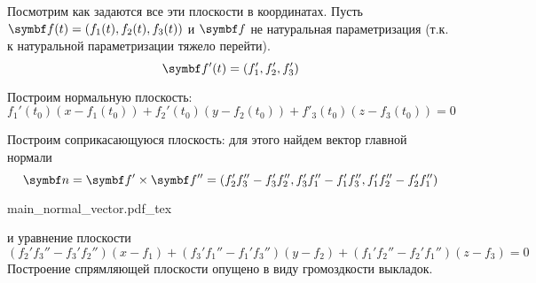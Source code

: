 \documentclass[main]{subfiles}
\begin{document}
Посмотрим как задаются все эти плоскости в координатах.
Пусть
$\vf(t) = (f_1(t), f_2(t), f_3(t))$
и $\vf$ не натуральная параметризация (т.к. к натуральной параметризации тяжело перейти).
\[\vf'(t) = (f_1',f_2',f_3')\]

Построим нормальную плоскость:
\[f_1'(t_0)(x - f_1(t_0)) + f_2'(t_0)(y - f_2(t_0)) + f'_3(t_0)(z - f_3(t_0)) = 0\]

Построим соприкасающуюся плоскость:
для этого найдем вектор главной нормали
\[\vn = \vf' \times \vf'' = (f_2'f_3'' - f_3'f_2'',f_3'f_1'' - f_1'f_3'', f_1'f_2'' - f_2'f_1'')\]
\begin{center}
    {main_normal_vector.pdf_tex}
\end{center}
и уравнение плоскости
\[(f_2'f_3'' - f_3'f_2'')(x - f_1) + (f_3'f_1'' - f_1'f_3'')(y - f_2) + (f_1'f_2'' - f_2'f_1'')(z - f_3) = 0\]
Построение спрямляющей плоскости опущено в виду громоздкости выкладок.
\end{document}
